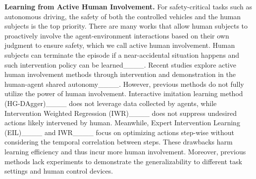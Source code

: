 \textbf{Learning from Active Human Involvement.}
For safety-critical tasks such as autonomous driving, the safety of both the controlled vehicles and the human subjects is the top priority. 
There are many works that allow human subjects to proactively involve the agent-environment interactions based on their own judgment to ensure safety, which we call active human involvement.
Human subjects can terminate the episode if a near-accidental situation happens and such intervention policy can be learned____. 
Recent studies explore active human involvement methods through intervention and demonstration in the human-agent shared autonomy____.
However, previous methods do not fully utilize the power of human involvement.
Interactive imitation learning method (HG-DAgger)____ does not leverage data collected by agents, while Intervention Weighted Regression (IWR)____ does not suppress undesired actions likely intervened by human.
Meanwhile, Expert Intervention Learning (EIL)____ and IWR____ focus on optimizing actions step-wise without considering the temporal correlation between steps.
These drawbacks harm learning efficiency and thus incur more human involvement.
Moreover, previous methods lack experiments to demonstrate the generalizability to different task settings and human control devices.



